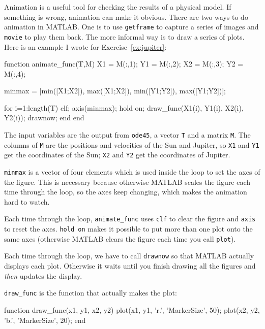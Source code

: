 \documentclass[
]{book}
\numberwithin{Answer}{chapter}
\numberwithin{Exercise}{chapter}
\begin{document}
Animation is a useful tool for checking the results of a physical
model.  If something is wrong, animation can make it obvious.
There are two ways to do animation in MATLAB.  One is to use
{\tt getframe} to capture a series of images and {\tt movie} to
play them back.
The more informal way is to draw a series of plots.
Here is an example I wrote for Exercise~\ref{ex:jupiter}:

\begin{code}
function animate_func(T,M)
    X1 = M(:,1);
    Y1 = M(:,2);
    X2 = M(:,3);
    Y2 = M(:,4);

    minmax = [min([X1;X2]), max([X1;X2]), min([Y1;Y2]), max([Y1;Y2])];

    for i=1:length(T)
        clf;
        axis(minmax);
        hold on;
        draw_func(X1(i), Y1(i), X2(i), Y2(i));
        drawnow;
    end
end
\end{code}

The input variables are the output from {\tt ode45}, a vector
{\tt T} and a matrix {\tt M}.  The columns of {\tt M} are the
positions and velocities of the Sun and Jupiter, so
{\tt X1} and {\tt Y1} get the coordinates of the Sun;
{\tt X2} and {\tt Y2} get the coordinates of Jupiter.

{\tt minmax} is a vector of four elements which is used inside
the loop to set the axes of the figure.  This is necessary because
otherwise MATLAB scales the figure each time through the loop,
so the axes keep changing, which makes the animation hard
to watch.

Each time through the loop, {\tt animate\_func} uses {\tt clf}
to clear the figure and {\tt axis} to reset the axes.  {\tt hold
on} makes it possible to put more than one plot onto the same
axes (otherwise MATLAB clears the figure each time you call
{\tt plot}).

Each time through the loop, we have to call {\tt drawnow} so
that MATLAB actually displays each plot.  Otherwise it waits
until you finish drawing all the figures and {\em then} updates
the display.

{\tt draw\_func} is the function that actually makes the
plot:

\begin{code}
function draw_func(x1, y1, x2, y2)
    plot(x1, y1, 'r.', 'MarkerSize', 50);
    plot(x2, y2, 'b.', 'MarkerSize', 20);
end
\end{code}
\end{document}
